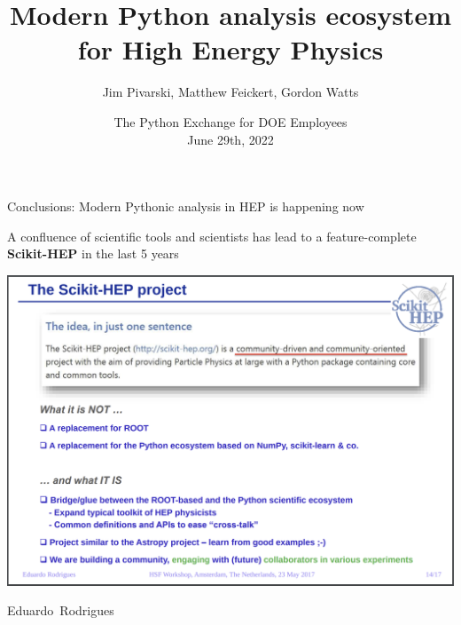 \documentclass[aspectratio=169]{beamer}
\title[June 29th, 2022]{%
Modern Python analysis ecosystem for High Energy Physics%
}
\author{Jim Pivarski, Matthew Feickert, Gordon Watts}
\institute{Princeton University, University of Wisconsin-Madison, University of Washington}
\date[June 29th, 2022]{The Python Exchange for DOE Employees\\June 29th, 2022}
\begin{document}

\begin{frame}
  \titlepage
\end{frame}





%

%


\begin{frame}{Conclusions: Modern Pythonic analysis in HEP is happening now}
\Large
\begin{center}
A confluence of scientific tools and scientists has lead to a feature-complete \textbf{Scikit-HEP} in the last 5 years
\end{center}
\vspace{0.1 cm}

\begin{center}
\href{https://indico.cern.ch/event/613842/contributions/2591057/}{\includegraphics[width=0.625\linewidth]{scikit-hep-in-2017.png}}
\end{center}

\vspace{-1.5 cm}
\hfill \mbox{Eduardo Rodrigues\hspace{-0.5 cm}}
\vspace{1.5 cm}
\end{frame}
\end{document}
